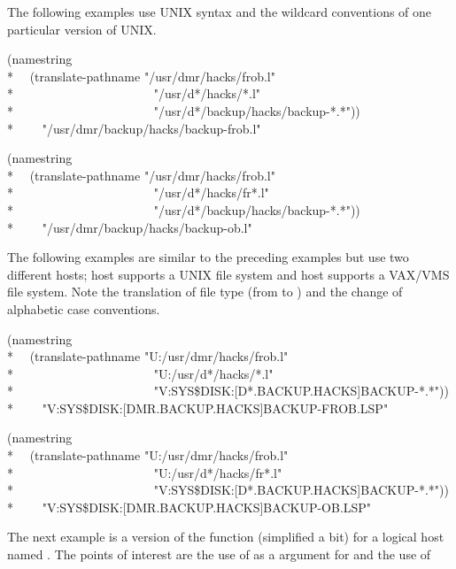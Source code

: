 \begin{newer}
The following examples use UNIX syntax and the wildcard conventions of one
particular version of UNIX.
\begin{lisp}
(namestring \\*
~~(translate-pathname "/usr/dmr/hacks/frob.l" \\*
~~~~~~~~~~~~~~~~~~~~~~"/usr/d*/hacks/*.l" \\*
~~~~~~~~~~~~~~~~~~~~~~"/usr/d*/backup/hacks/backup-*.*")) \\*
~~~\EV\ "/usr/dmr/backup/hacks/backup-frob.l"
\end{lisp}
\goodbreak
\begin{lisp}
(namestring \\*
~~(translate-pathname "/usr/dmr/hacks/frob.l" \\*
~~~~~~~~~~~~~~~~~~~~~~"/usr/d*/hacks/fr*.l" \\*
~~~~~~~~~~~~~~~~~~~~~~"/usr/d*/backup/hacks/backup-*.*")) \\*
~~~\EV\ "/usr/dmr/backup/hacks/backup-ob.l"
\end{lisp}
The following examples are similar to the preceding examples
but use two different hosts; host  supports a UNIX file system
and host  supports a VAX/VMS file system.  Note the translation
of file type (from  to ) and the change of alphabetic case conventions.
\begin{lisp}
(namestring \\*
~~(translate-pathname "U:/usr/dmr/hacks/frob.l" \\*
~~~~~~~~~~~~~~~~~~~~~~"U:/usr/d*/hacks/*.l" \\*
~~~~~~~~~~~~~~~~~~~~~~"V:SYS\$DISK:[D*.BACKUP.HACKS]BACKUP-*.*")) \\*
~~~\EV\ "V:SYS\$DISK:[DMR.BACKUP.HACKS]BACKUP-FROB.LSP"
\end{lisp}
\begin{lisp}
(namestring \\*
~~(translate-pathname "U:/usr/dmr/hacks/frob.l" \\*
~~~~~~~~~~~~~~~~~~~~~~"U:/usr/d*/hacks/fr*.l" \\*
~~~~~~~~~~~~~~~~~~~~~~"V:SYS\$DISK:[D*.BACKUP.HACKS]BACKUP-*.*")) \\*
~~~\EV\ "V:SYS\$DISK:[DMR.BACKUP.HACKS]BACKUP-OB.LSP"
\end{lisp}
The next example is a version of the
function  (simplified a bit) for a logical host named .
The points of interest are the use of  as
a  argument for  and the use of 

\end{newer}

